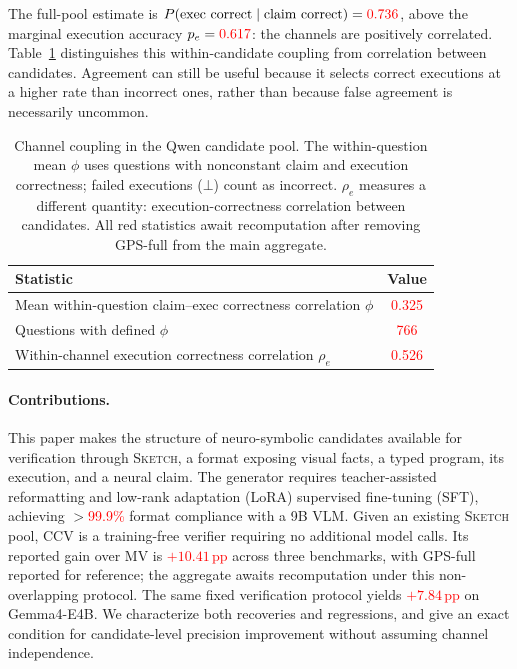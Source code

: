 \documentclass{article}
\newcommand{\sketch}{\textsc{Sketch}}
\newcommand{\ccv}{\textsc{CCV}}
\newcommand{\pp}{\,\text{pp}}
\newcommand{\recheck}[1]{\textcolor{red}{#1}}
\begin{document}
The full-pool estimate is $P(\text{exec correct}\mid\text{claim correct})=\recheck{0.736}$, above the marginal execution accuracy $p_e=\recheck{0.617}$: the channels are positively correlated. Table~\ref{tab:coupling} distinguishes this within-candidate coupling from correlation between candidates. Agreement can still be useful because it selects correct executions at a higher rate than incorrect ones, rather than because false agreement is necessarily uncommon.

\begin{table}[t]
\centering
\caption{Channel coupling in the Qwen candidate pool. The within-question mean $\phi$ uses questions with nonconstant claim and execution correctness; failed executions ($\bot$) count as incorrect. $\rho_e$ measures a different quantity: execution-correctness correlation between candidates. All red statistics await recomputation after removing GPS-full from the main aggregate.}
\label{tab:coupling}
\small
\begin{tabular}{lc}
\toprule
Statistic & Value \\
\midrule
Mean within-question claim--exec correctness correlation $\phi$ & \recheck{0.325} \\
Questions with defined $\phi$ & \recheck{766} \\
Within-channel execution correctness correlation $\rho_e$ & \recheck{0.526} \\
\bottomrule
\end{tabular}
\end{table}

\paragraph{Contributions.}
This paper makes the structure of neuro-symbolic candidates available for verification through \sketch{}, a format exposing visual facts, a typed program, its execution, and a neural claim. The generator requires teacher-assisted reformatting and low-rank adaptation (LoRA) supervised fine-tuning (SFT), achieving $>$\recheck{99.9\%} format compliance with a 9B VLM. Given an existing \sketch{} pool, \ccv{} is a training-free verifier requiring no additional model calls. Its reported gain over MV is \recheck{$+10.41\pp$} across three benchmarks, with GPS-full reported for reference; the aggregate awaits recomputation under this non-overlapping protocol. The same fixed verification protocol yields \recheck{$+7.84\pp$} on Gemma4-E4B. We characterize both recoveries and regressions, and give an exact condition for candidate-level precision improvement without assuming channel independence.
\end{document}
